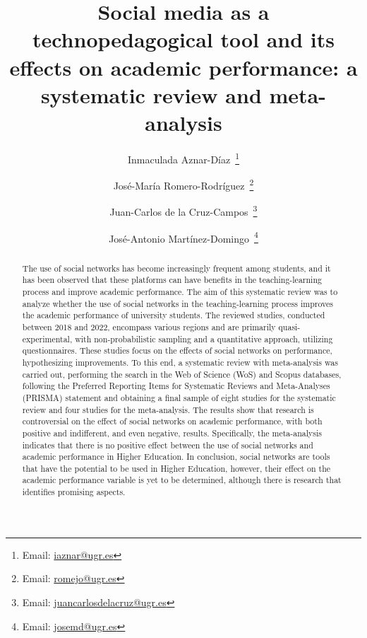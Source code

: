 \documentclass[english]{textolivre}
\title{Social media as a technopedagogical tool and its effects on academic performance: a systematic review and meta-analysis}
\author[1]{Inmaculada Aznar-Díaz~\orcid{0000-0002-0018-1150}\thanks{Email: \href{mailto:iaznar@ugr.es}{iaznar@ugr.es}}}
\author[1]{José-María Romero-Rodríguez~\orcid{0000-0002-9284-8919}\thanks{Email: \href{mailto:romejo@ugr.es}{romejo@ugr.es}}}
\author[1]{Juan-Carlos de la Cruz-Campos~\orcid{0000-0002-9263-6799}\thanks{Email: \href{mailto: juancarlosdelacruz@ugr.es}{juancarlosdelacruz@ugr.es}}}
\author[1]{José-Antonio Martínez-Domingo~\orcid{0000-0002-4976-7320}\thanks{Email: \href{mailto: josemd@ugr.es}{josemd@ugr.es}}}
\affil[1]{University of Granada, Faculty of Education Sciences, Department of Didactics and School Organization, Granada, Spain.}
\begin{document}
\maketitle

\begin{polyabstract}
\begin{abstract}
The use of social networks has become increasingly frequent among students, and it has been observed that these platforms can have benefits in the teaching-learning process and improve academic performance. The aim of this systematic review was to analyze whether the use of social networks in the teaching-learning process improves the academic performance of university students. The reviewed studies, conducted between 2018 and 2022, encompass various regions and are primarily quasi-experimental, with non-probabilistic sampling and a quantitative approach, utilizing questionnaires. These studies focus on the effects of social networks on performance, hypothesizing improvements. To this end, a systematic review with meta-analysis was carried out, performing the search in the Web of Science (WoS) and Scopus databases, following the Preferred Reporting Items for Systematic Reviews and Meta-Analyses (PRISMA) statement and obtaining a final sample of eight studies for the systematic review and four studies for the meta-analysis. The results show that research is controversial on the effect of social networks on academic performance, with both positive and indifferent, and even negative, results. Specifically, the meta-analysis indicates that there is no positive effect between the use of social networks and academic performance in Higher Education. In conclusion, social networks are tools that have the potential to be used in Higher Education, however, their effect on the academic performance variable is yet to be determined, although there is research that identifies promising aspects.

\end{abstract}


\end{polyabstract}
\end{document}
